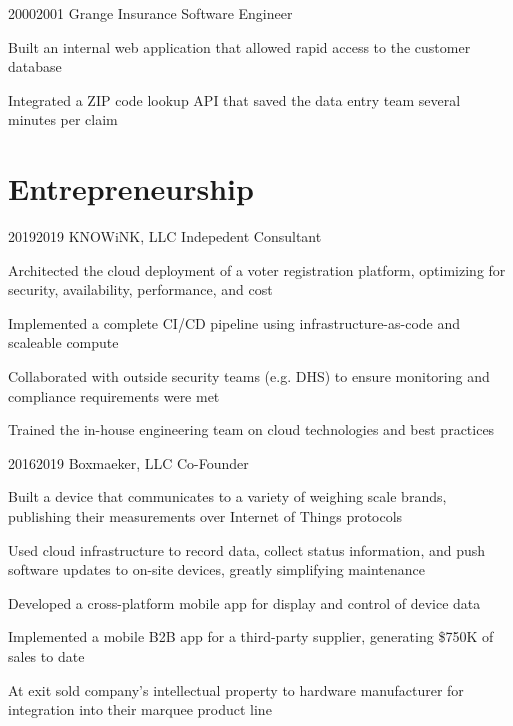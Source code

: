 \documentclass{article}
\begin{document}
\job
  {2000}{2001}
  {Grange Insurance}
  {Software Engineer}
  {\begin{achievements}
    \item Built an internal web application that allowed rapid access to the customer database
    \item Integrated a ZIP code lookup API that saved the data entry team several minutes per claim
  \end{achievements}}

\pagebreak

\section{Entrepreneurship}

\job
  {2019}{2019}
  {KNOWiNK, LLC}
  {Indepedent Consultant}
  {\begin{achievements}
    \item Architected the cloud deployment of a voter registration platform, optimizing for security, availability, performance, and cost
    \item Implemented a complete CI/CD pipeline using infrastructure-as-code and scaleable compute
    \item Collaborated with outside security teams (e.g. DHS) to ensure monitoring and compliance requirements were met
    \item Trained the in-house engineering team on cloud technologies and best practices
  \end{achievements}}

\job
  {2016}{2019}
  {Boxmaeker, LLC}
  {Co-Founder}
  {\begin{achievements}
    \item Built a device that communicates to a variety of weighing scale brands, publishing their measurements over Internet of Things protocols
    \item Used cloud infrastructure to record data, collect status information, and push software updates to on-site devices, greatly simplifying maintenance
    \item Developed a cross-platform mobile app for display and control of device data
    \item Implemented a mobile B2B app for a third-party supplier, generating \$750K of sales to date
    \item At exit sold company's intellectual property to hardware manufacturer for integration into their marquee product line
  \end{achievements}}
\end{document}
